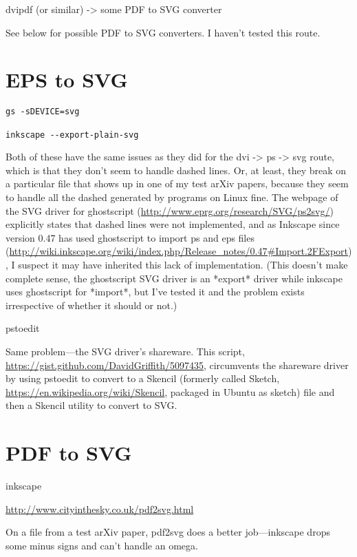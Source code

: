 \documentclass[12pt]{article}
\begin{document}
dvipdf (or similar) -> some PDF to SVG converter

See below for possible PDF to SVG converters.  I haven't tested this
route.


\section{EPS to SVG}
\label{sec:eps2svg}

\begin{lstlisting}
gs -sDEVICE=svg

inkscape --export-plain-svg
\end{lstlisting}

Both of these have the same issues as they did for the dvi -> ps ->
svg route, which is that they don't seem to handle dashed lines.  Or,
at least, they break on a particular file that shows up in one of my
test arXiv papers, because they seem to handle all the dashed
generated by programs on Linux fine.  The webpage of the SVG driver
for ghostscript (\url{http://www.eprg.org/research/SVG/ps2svg/})
explicitly states that dashed lines were not implemented, and as
Inkscape since version 0.47 has used ghostscript to import ps and eps
files
(\url{http://wiki.inkscape.org/wiki/index.php/Release_notes/0.47#Import.2FExport}),
I suspect it may have inherited this lack of implementation.  (This
doesn't make complete sense, the ghostscript SVG driver is an *export*
driver while inkscape uses ghostscript for *import*, but I've tested
it and the problem exists irrespective of whether it should or not.)

pstoedit

Same problem---the SVG driver's shareware.  This script,
\url{https://gist.github.com/DavidGriffith/5097435}, circumvents the
shareware driver by using pstoedit to convert to a Skencil (formerly
called Sketch, \url{https://en.wikipedia.org/wiki/Skencil}, packaged
in Ubuntu as sketch) file and then a Skencil utility to convert to
SVG.


\section{PDF to SVG}
\label{sec:pdf2svg}

inkscape

\url{http://www.cityinthesky.co.uk/pdf2svg.html}

On a file from a test arXiv paper, pdf2svg does a better
job---inkscape drops some minus signs and can't handle an omega.
\end{document}
